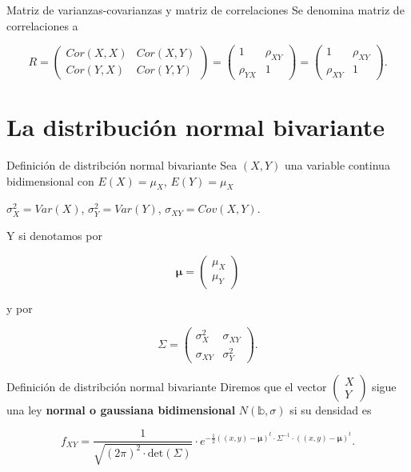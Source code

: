 \documentclass[
  ignorenonframetext,
]{beamer}
\begin{document}
\begin{frame}{Matriz de varianzas-covarianzas y matriz de correlaciones}
\protect\hypertarget{matriz-de-varianzas-covarianzas-y-matriz-de-correlaciones-2}{}
Se denomina matriz de correlaciones a

\[
R=
\left(
\begin{matrix}Cor(X,X) &  Cor(X,Y)\\
Cor(Y,X) & Cor(Y,Y)
\end{matrix}
\right)
=
\left(
\begin{matrix} 
1 &  \rho_{XY}\\ 
\rho_{Y X} & 1
\end{matrix}
\right)=
\left(
\begin{matrix}
1 &  \rho_{XY}\\ \rho_{X Y} & 1
\end{matrix}
\right).
\]
\end{frame}

\hypertarget{la-distribuciuxf3n-normal-bivariante}{%
\section{La distribución normal
bivariante}\label{la-distribuciuxf3n-normal-bivariante}}

\begin{frame}{Definición de distribción normal bivariante}
\protect\hypertarget{definiciuxf3n-de-distribciuxf3n-normal-bivariante}{}
Sea \((X,Y)\) una variable continua bidimensional con \(E(X)=\mu_X\),
\(E(Y)=\mu_X\)

\(\sigma^2_X=Var(X)\), \(\sigma^2_Y=Var(Y)\), \(\sigma_{XY}=Cov(X,Y)\).

Y si denotamos por

\[
\mathbf{\mu}=\left(\begin{array}{c}\mu_X \\ \mu_Y\end{array}\right)
\]

y por

\[
 \Sigma=\left(\begin{matrix}
 \sigma_{X}^2 & \sigma_{XY}\\
 \sigma_{XY} &  \sigma_{Y}^2
 \end{matrix}\right).
\]
\end{frame}

\begin{frame}{Definición de distribción normal bivariante}
\protect\hypertarget{definiciuxf3n-de-distribciuxf3n-normal-bivariante-1}{}
Diremos que el vector
\(\left(\begin{array}{c} X \\ Y\end{array}\right)\) sigue una ley
\textbf{normal o gaussiana bidimensional} \(N(\mathbb{b},\sigma)\) si su
densidad es

\[
f_{XY}=\frac{1}{\sqrt{(2\pi)^2\cdot \mathrm{det}(\Sigma)}} \cdot e^{-\frac{1}{2} ((x,y)-\mathbf{\mu})^t\cdot \Sigma^{-1}\cdot  ((x,y)-\mathbf{\mu})^t}.
\]
\end{frame}
\end{document}
